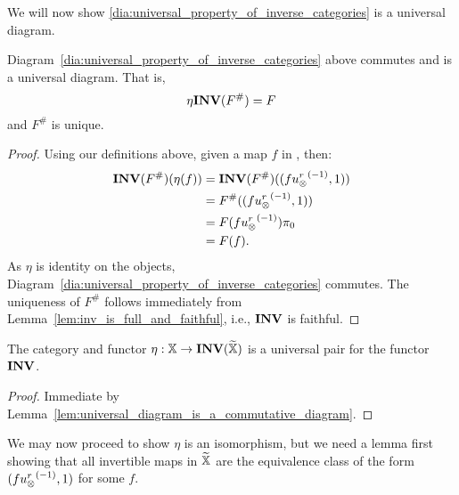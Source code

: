 We will now  show \ref{dia:universal_property_of_inverse_categories} is a universal diagram.


\begin{lemma}\label{lem:universal_diagram_is_a_commutative_diagram}
  Diagram~\ref{dia:universal_property_of_inverse_categories} above commutes and is a universal diagram.
  That is,
  \[
    \eta\mathbf{INV}({F^{\#}}) = F
  \]
  and $F^{\#}$ is unique.
\end{lemma}
\begin{proof}
  Using our definitions above, given a map $f$ in \X, then:
  \begin{align*}
    \mathbf{INV}({F^{\#}})(\eta(f)) &= \mathbf{INV}({F^{\#}})((f{u_{\otimes}^r}^{(-1)},1))\\
    &= F^{\#}((f{u_{\otimes}^r}^{(-1)},1))\\
    &= F(f{u_{\otimes}^r}^{(-1)})\pi_0\\
    &= F(f).\\
  \end{align*}
  As $\eta$ is identity on the objects, Diagram~\ref{dia:universal_property_of_inverse_categories}
  commutes.
  The uniqueness of $F^{\#}$ follows immediately from Lemma~\ref{lem:inv_is_full_and_faithful},
  i.e., $\mathbf{INV}$ is faithful.
\end{proof}
\begin{corollary}\label{cor:eta_and_xt_are_universal_for_inv}
  The category \Xt and functor $\eta:\mathbb{X}\to \mathbf{INV}({\widetilde{\mathbb{X}}})$ is a universal pair for the functor $\mathbf{INV}$.
\end{corollary}
\begin{proof}
  Immediate by Lemma~\ref{lem:universal_diagram_is_a_commutative_diagram}.
\end{proof}

We may now proceed to show $\eta$ is an isomorphism, but we need a lemma first showing that all
invertible maps in $\widetilde{\mathbb{X}}$ are the equivalence class of the form  $(f {u_{\otimes}^r}^{(-1)},1)$ for some $f$.

